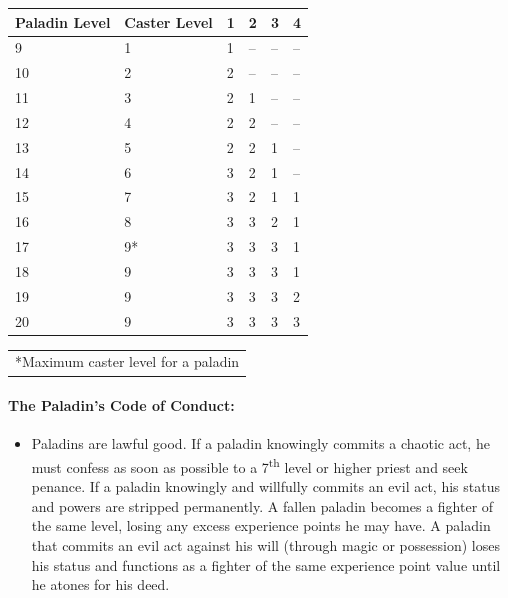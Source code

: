 \begin{multicols}{2}
\noindent
\begin{minipage}{\columnwidth}

\label{paladinspells}
\noindent
\begin{tabular}{|m{}|m{}|m{}|m{}|m{}|m{}|}
\hline
Paladin Level	& Caster Level	& 1	& 2	& 3	& 4 \\
\hline\hline
\rowcolor[gray]{.9}9	& 1	 	& 1	& --	& --	& -- \\
10	& 2	 	& 2	& --	& --	& -- \\
\rowcolor[gray]{.9}11	& 3	 	& 2	& 1		& --	& -- \\
12	& 4	 	& 2	& 2		& --	& -- \\
\rowcolor[gray]{.9}13	& 5	 	& 2	& 2		& 1		& -- \\
14	& 6	 	& 3	& 2		& 1		& -- \\
\rowcolor[gray]{.9}15	& 7	 	& 3	& 2		& 1		& 1 \\
16	& 8		& 3	& 3		& 2		& 1 \\
\rowcolor[gray]{.9}17	& 9*	& 3	& 3		& 3		& 1 \\
18	& 9		& 3	& 3		& 3		& 1 \\
\rowcolor[gray]{.9}19	& 9		& 3	& 3		& 3		& 2 \\
20	& 9		& 3	& 3		& 3		& 3 \\
\hline
\end{tabular}
\noindent
\begin{tabular}{p{\columnwidth}}
*Maximum caster level for a paladin \\
\end{tabular}\vspace{.5em}

\end{minipage}

\paragraph{The Paladin's Code of Conduct:}

\begin{itemize}

\item Paladins are lawful good.  If a paladin knowingly commits a chaotic act, he must confess as soon as possible to a 7\textsuperscript{th} level or higher priest and seek penance.  If a paladin knowingly and willfully commits an evil act, his status and powers are stripped permanently.  A fallen paladin becomes a fighter of the same level, losing any excess experience points he may have.  A paladin that commits an evil act against his will (through magic or possession) loses his status and functions as a fighter of the same experience point value until he atones for his deed.


\end{itemize}
\end{multicols}
